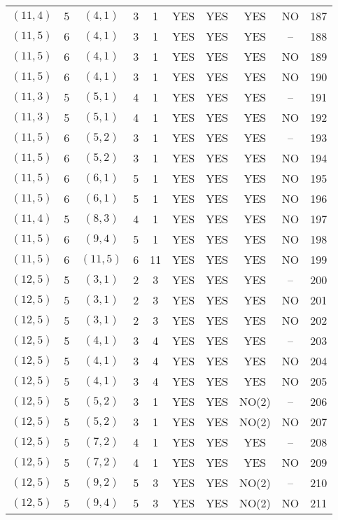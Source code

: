 \begin{longtable}{|c|c|c|c|c|c|c|c|c|c|}
$(11, 4)$ & 5 & $(4, 1)$ & 3 & 1 & YES & YES & YES & NO & 187\\
$(11, 5)$ & 6 & $(4, 1)$ & 3 & 1 & YES & YES & YES & -- & 188\\
$(11, 5)$ & 6 & $(4, 1)$ & 3 & 1 & YES & YES & YES & NO & 189\\
$(11, 5)$ & 6 & $(4, 1)$ & 3 & 1 & YES & YES & YES & NO & 190\\
$(11, 3)$ & 5 & $(5, 1)$ & 4 & 1 & YES & YES & YES & -- & 191\\
$(11, 3)$ & 5 & $(5, 1)$ & 4 & 1 & YES & YES & YES & NO & 192\\
$(11, 5)$ & 6 & $(5, 2)$ & 3 & 1 & YES & YES & YES & -- & 193\\
$(11, 5)$ & 6 & $(5, 2)$ & 3 & 1 & YES & YES & YES & NO & 194\\
$(11, 5)$ & 6 & $(6, 1)$ & 5 & 1 & YES & YES & YES & NO & 195\\
$(11, 5)$ & 6 & $(6, 1)$ & 5 & 1 & YES & YES & YES & NO & 196\\
$(11, 4)$ & 5 & $(8, 3)$ & 4 & 1 & YES & YES & YES & NO & 197\\
$(11, 5)$ & 6 & $(9, 4)$ & 5 & 1 & YES & YES & YES & NO & 198\\
$(11, 5)$ & 6 & $(11, 5)$ & 6 & 11 & YES & YES & YES & NO & 199\\
$(12, 5)$ & 5 & $(3, 1)$ & 2 & 3 & YES & YES & YES & -- & 200\\
$(12, 5)$ & 5 & $(3, 1)$ & 2 & 3 & YES & YES & YES & NO & 201\\
$(12, 5)$ & 5 & $(3, 1)$ & 2 & 3 & YES & YES & YES & NO & 202\\
$(12, 5)$ & 5 & $(4, 1)$ & 3 & 4 & YES & YES & YES & -- & 203\\
$(12, 5)$ & 5 & $(4, 1)$ & 3 & 4 & YES & YES & YES & NO & 204\\
$(12, 5)$ & 5 & $(4, 1)$ & 3 & 4 & YES & YES & YES & NO & 205\\
$(12, 5)$ & 5 & $(5, 2)$ & 3 & 1 & YES & YES & NO(2) & -- & 206\\
$(12, 5)$ & 5 & $(5, 2)$ & 3 & 1 & YES & YES & NO(2) & NO & 207\\
$(12, 5)$ & 5 & $(7, 2)$ & 4 & 1 & YES & YES & YES & -- & 208\\
$(12, 5)$ & 5 & $(7, 2)$ & 4 & 1 & YES & YES & YES & NO & 209\\
$(12, 5)$ & 5 & $(9, 2)$ & 5 & 3 & YES & YES & NO(2) & -- & 210\\
$(12, 5)$ & 5 & $(9, 4)$ & 5 & 3 & YES & YES & NO(2) & NO & 211\\

\end{longtable}
